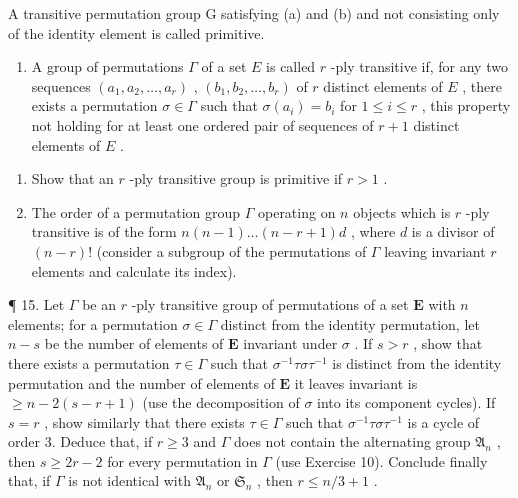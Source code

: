 A transitive permutation group G satisfying (a) and (b) and not consisting only of the identity element is called primitive.

\begin{enumerate}
\def\labelenumi{\arabic{enumi}.}
\setcounter{enumi}{13}
\tightlist
\item
  A group of permutations \(\Gamma\) of a set \(E\) is called \(r\) -ply transitive if, for any two sequences \((a_1, a_2, \ldots, a_r)\) , \((b_1, b_2, \ldots, b_r)\) of \(r\) distinct elements of \(E\) , there exists a permutation \(\sigma \in \Gamma\) such that \(\sigma(a_i) = b_i\) for \(1 \leqslant i \leqslant r\) , this property not holding for at least one ordered pair of sequences of \(r + 1\) distinct elements of \(E\) .
\end{enumerate}

\begin{enumerate}
\def\labelenumi{(\alph{enumi})}
\item
  Show that an \(r\) -ply transitive group is primitive if \(r > 1\) .
\item
  The order of a permutation group \(\Gamma\) operating on \(n\) objects which is \(r\) -ply transitive is of the form \(n(n - 1)\ldots (n - r + 1)d\) , where \(d\) is a divisor of \((n - r)!\) (consider a subgroup of the permutations of \(\Gamma\) leaving invariant \(r\) elements and calculate its index).
\end{enumerate}

¶ 15. Let \(\Gamma\) be an \(r\) -ply transitive group of permutations of a set \(\mathbf{E}\) with \(n\) elements; for a permutation \(\sigma \in \Gamma\) distinct from the identity permutation, let \(n - s\) be the number of elements of \(\mathbf{E}\) invariant under \(\sigma\) . If \(s > r\) , show that there exists a permutation \(\tau \in \Gamma\) such that \(\sigma^{-1}\tau \sigma \tau^{-1}\) is distinct from the identity permutation and the number of elements of \(\mathbf{E}\) it leaves invariant is \(\geqslant n - 2(s - r + 1)\) (use the decomposition of \(\sigma\) into its component cycles). If \(s = r\) , show similarly that there exists \(\tau \in \Gamma\) such that \(\sigma^{-1}\tau \sigma \tau^{-1}\) is a cycle of order 3. Deduce that, if \(r \geqslant 3\) and \(\Gamma\) does not contain the alternating group \(\mathfrak{A}_n\) , then \(s \geqslant 2r - 2\) for every permutation in \(\Gamma\) (use Exercise 10). Conclude finally that, if \(\Gamma\) is not identical with \(\mathfrak{A}_n\) or \(\mathfrak{S}_n\) , then \(r \leqslant n/3 + 1\) .


